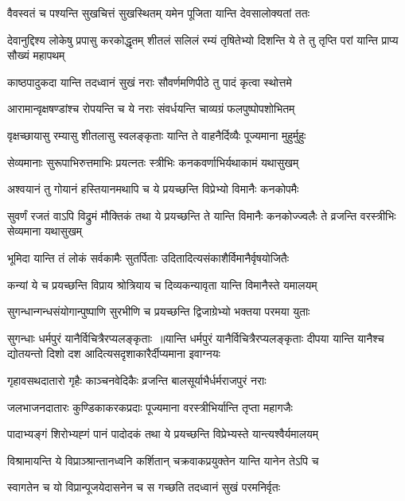\twolineshloka
{वैवस्वतं च पश्यन्ति सुखचित्तं सुखस्थितम्}
{यमेन पूजिता यान्ति देवसालोक्यतां ततः}


\threelineshloka
{देवानुद्दिश्य लोकेषु प्रपासु करकोद्धृतम्}
{शीतलं सलिलं रम्यं तृषितेभ्यो दिशन्ति ये}
{ते तु तृप्ति परां यान्ति प्राप्य सौख्यं महापथम्}


\twolineshloka
{काष्ठपादुकदा यान्ति तदध्वानं सुखं नराः}
{सौवर्णमणिपीठे तु पादं कृत्वा स्थोत्तमे}


\twolineshloka
{आरामान्वृक्षषण्डांश्च रोपयन्ति च ये नराः}
{संवर्धयन्ति चाव्यग्रं फलपुष्पोपशोभितम्}


\threelineshloka
{वृक्षच्छायासु रम्यासु शीतलासु स्वलङ्कृताः}
{यान्ति ते वाहनैर्दिव्यैः पूज्यमाना मुहुर्मुहुः}
{}


\twolineshloka
{सेव्यमानाः सुरूपाभिरुत्तमाभिः प्रयत्नतः}
{स्त्रीभिः कनकवर्णाभिर्यथाकामं यथासुखम्}


\twolineshloka
{अश्वयानं तु गोयानं हस्तियानमथापि च}
{ये प्रयच्छन्ति विप्रेभ्यो विमानैः कनकोपमैः}


\threelineshloka
{सुवर्णं रजतं वाऽपि विद्रुमं मौक्तिकं तथा}
{ये प्रयच्छन्ति ते यान्ति विमानैः कनकोज्ज्वलैः}
{ते व्रजन्ति वरस्त्रीभिः सेव्यमाना यथासुखम्}


\twolineshloka
{भूमिदा यान्ति तं लोकं सर्वकामैः सुतर्पिताः}
{उदितादित्यसंकाशैर्विमानैर्वृषयोजितैः}


\twolineshloka
{कन्यां ये च प्रयच्छन्ति विप्राय श्रोत्रियाय च}
{दिव्यकन्यावृता यान्ति विमानैस्ते यमालयम्}


\twolineshloka
{सुगन्धान्गन्धसंयोगान्पुष्पाणि सुरभीणि च}
{प्रयच्छन्ति द्विजाग्रेभ्यो भक्तया परमया युताः}


सुगन्धाः धर्मपुरं यानैर्विचित्रैरप्यलङ्कृताः ॥यान्ति धर्मपुरं यानैर्विचित्रैरप्यलङ्कृताः
\twolineshloka
{दीपया यान्ति यानैश्च द्योतयन्तो दिशो दश}
{आदित्यसदृशाकारैर्दीप्यमाना इवाग्नयः}


\twolineshloka
{गृहावसथदातारो गृहैः काञ्चनवेदिकैः}
{व्रजन्ति बालसूर्याभैर्धर्मराजपुरं नराः}


\twolineshloka
{जलभाजनदातारः कुण्डिकाकरकप्रदाः}
{पूज्यमाना वरस्त्रीभिर्यान्ति तृप्ता महागजैः}


\twolineshloka
{पादाभ्यङ्गं शिरोभ्यह्गं पानं पादोदकं तथा}
{ये प्रयच्छन्ति विप्रेभ्यस्ते यान्त्यश्वैर्यमालयम्}


\twolineshloka
{विश्रामायन्ति ये विप्राञ्श्रान्तानध्वनि कर्शितान्}
{चक्रवाकप्रयुक्तेन यान्ति यानेन तेऽपि च}


\twolineshloka
{स्वागतेन च यो विप्रान्पूजयेदासनेन च}
{स गच्छति तदध्वानं सुखं परमनिर्वृतः}


